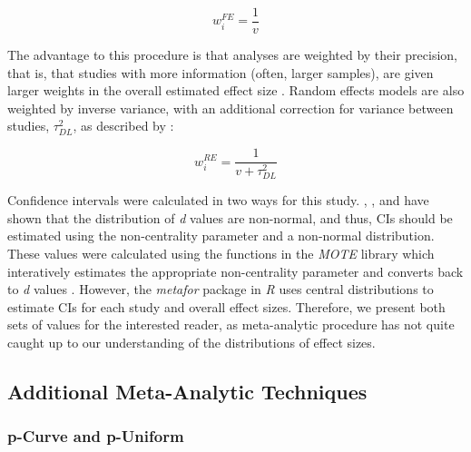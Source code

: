 \documentclass[english,man]{apa6}
\theoremstyle{definition}
\theoremstyle{definition}
\theoremstyle{definition}
\theoremstyle{remark}
\begin{document}
\[
w_{i}^{FE} = \frac {1} {v}
\]

The advantage to this procedure is that analyses are weighted by their
precision, that is, that studies with more information (often, larger
samples), are given larger weights in the overall estimated effect size
\autocite{Borenstein2007}. Random effects models are also weighted by
inverse variance, with an additional correction for variance between
studies, \(\tau^2_{DL}\), as described by \textcite{DerSimonian1986}:

\[
w_{i}^{RE} = \frac {1} {v + \tau^2_{DL}}
\]

Confidence intervals were calculated in two ways for this study.
\textcite{Cumming2012}, \textcite{Kelley2007}, and
\textcite{Smithson2001} have shown that the distribution of \emph{d}
values are non-normal, and thus, CIs should be estimated using the
non-centrality parameter and a non-normal distribution. These values
were calculated using the functions in the \emph{MOTE} library which
interatively estimates the appropriate non-centrality parameter and
converts back to \emph{d} values \autocites[i.e., non-centrality
parameter divided by the square root of
\emph{n};][]{Buchanan2017}{Smithson2001}{Smithson2003}. However, the
\emph{metafor} package in \emph{R} uses central distributions to
estimate CIs for each study and overall effect sizes. Therefore, we
present both sets of values for the interested reader, as meta-analytic
procedure has not quite caught up to our understanding of the
distributions of effect sizes.

\subsection{Additional Meta-Analytic
Techniques}\label{additional-meta-analytic-techniques}

\subsubsection{p-Curve and p-Uniform}\label{p-curve-and-p-uniform}
\end{document}
